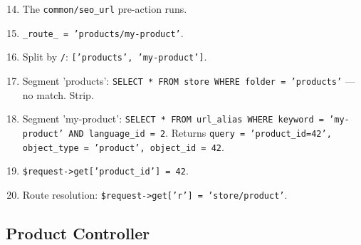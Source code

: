 \documentclass[11pt,a4paper]{article}
\begin{document}
\begin{enumerate}[leftmargin=1.6em,itemsep=2pt]
  \setcounter{enumi}{13}
  \item The \texttt{common/seo\_url} pre-action runs.
  \item \texttt{\_route\_ = 'products/my-product'}.
  \item Split by \texttt{/}: \texttt{['products', 'my-product']}.
  \item Segment 'products': \texttt{SELECT * FROM store WHERE folder =
        'products'} --- no match. Strip.
  \item Segment 'my-product': \texttt{SELECT * FROM url\_alias WHERE
        keyword = 'my-product' AND language\_id = 2}. Returns
        \texttt{query = 'product\_id=42', object\_type = 'product',
        object\_id = 42}.
  \item \texttt{\$request->get['product\_id'] = 42}.
  \item Route resolution: \texttt{\$request->get['r'] =
        'store/product'}.
\end{enumerate}

\subsection{Product Controller}
\end{document}
